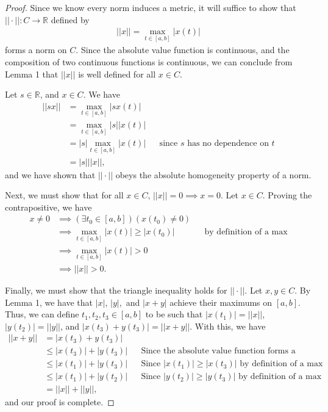 \documentclass[10pt,a4paper]{article}
\theoremstyle{theorem}
\theoremstyle{definition}
\begin{document}
\begin{proof}
Since we know every norm induces a metric, it will suffice to show that $|| \cdot ||: C \to \mathbb{R}$ defined by
\begin{align*}
||x|| = \max_{t \in [a, b]} |x(t)|
\end{align*}
forms a norm on $C$. Since the absolute value function is continuous, and the composition of two continuous functions is continuous, we can conclude from Lemma 1 that $|| x ||$ is well defined for all $x \in C$.

Let $s \in \mathbb{R}$, and $x \in C$. We have
\begin{align*}
||s x|| &= \max_{t \in [a, b]} |s x(t)|\\
&= \max_{t \in [a, b]} |s|| x(t)|\\
&= |s|\max_{t \in [a, b]} | x(t)| && \text{since } s \text{ has no dependence on } t\\
&= |s|||x||,
\end{align*}
and we have shown that $|| \cdot ||$ obeys the absolute homogeneity property of a norm.

Next, we must show that for all $x \in C$, $||x|| = 0 \implies x = 0$. Let $x \in C$. Proving the contrapositive, we have 
\begin{align*}
x \not = 0 &\implies (\exists t_0 \in [a, b])(x(t_0) \not = 0)\\
&\implies \max_{t \in [a, b]} |x(t)| \geq |x(t_0)| && \text{by definition of a max}\\
&\implies \max_{t \in [a, b]} |x(t)| > 0\\
&\implies ||x|| > 0.
\end{align*}

Finally, we must show that the triangle inequality holds for $|| \cdot ||$. Let $x, y \in C$. By Lemma 1, we have that $|x|$, $|y|, $ and $|x + y|$ achieve their maximums on $[a, b]$. Thus, we can define $t_1,t_2,t_3 \in [a, b]$ to be such that $|x(t_1)| = ||x||$, $|y(t_2)| = ||y||$, and $|x(t_3) + y(t_3)| = ||x + y||$. With this, we have
\begin{align*}
||x + y|| &= |x(t_3) + y(t_3)|\\
&\leq |x(t_3)| + |y(t_3)| && \text{Since the absolute value function forms a norm on the real numbers}\\
&\leq |x(t_1)| + |y(t_3)| && \text{Since } |x(t_1)| \geq |x(t_3)| \text{ by definition of a max}\\
&\leq |x(t_1)| + |y(t_2)| && \text{Since } |y(t_2)| \geq |y(t_3)| \text{ by definition of a max}\\
&= ||x|| + ||y||,
\end{align*}
and our proof is complete.
\end{proof}
\end{document}
